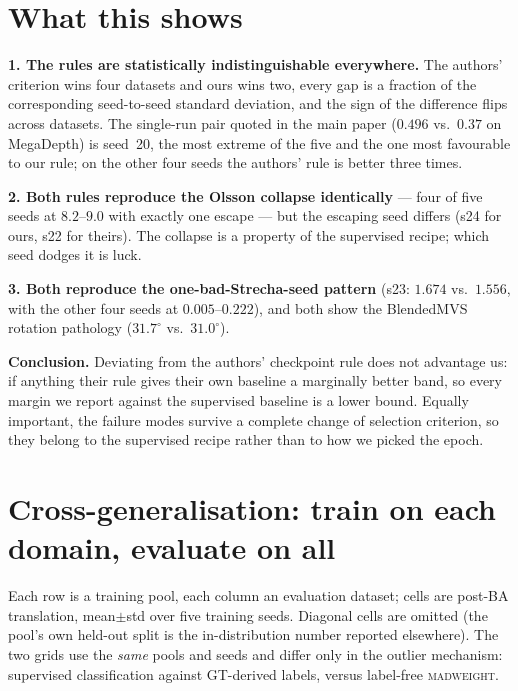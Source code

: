 \documentclass[11pt]{article}
\begin{document}
\section*{What this shows}
\textbf{1. The rules are statistically indistinguishable everywhere.} The authors'
criterion wins four datasets and ours wins two, every gap is a fraction of the
corresponding seed-to-seed standard deviation, and the sign of the difference flips
across datasets. The single-run pair quoted in the main paper ($0.496$ vs.\ $0.37$ on
MegaDepth) is seed~20, the most extreme of the five and the one most favourable to our
rule; on the other four seeds the authors' rule is better three times.

\textbf{2. Both rules reproduce the Olsson collapse identically} --- four of five seeds
at $8.2$--$9.0$ with exactly one escape --- but the escaping seed differs (s24 for ours,
s22 for theirs). The collapse is a property of the supervised recipe; which seed dodges
it is luck.

\textbf{3. Both reproduce the one-bad-Strecha-seed pattern} (s23: $1.674$ vs.\ $1.556$,
with the other four seeds at $0.005$--$0.222$), and both show the BlendedMVS rotation
pathology ($31.7^\circ$ vs.\ $31.0^\circ$).

\textbf{Conclusion.} Deviating from the authors' checkpoint rule does not advantage us:
if anything their rule gives their own baseline a marginally better band, so every
margin we report against the supervised baseline is a lower bound. Equally important,
the failure modes survive a complete change of selection criterion, so they belong to
the supervised recipe rather than to how we picked the epoch.

\newpage
\section*{Cross-generalisation: train on each domain, evaluate on all}
Each row is a training pool, each column an evaluation dataset; cells are post-BA
translation, mean$\pm$std over five training seeds. Diagonal cells are omitted (the
pool's own held-out split is the in-distribution number reported elsewhere). The two
grids use the \emph{same} pools and seeds and differ only in the outlier mechanism:
supervised classification against GT-derived labels, versus label-free \textsc{madweight}.
\end{document}
